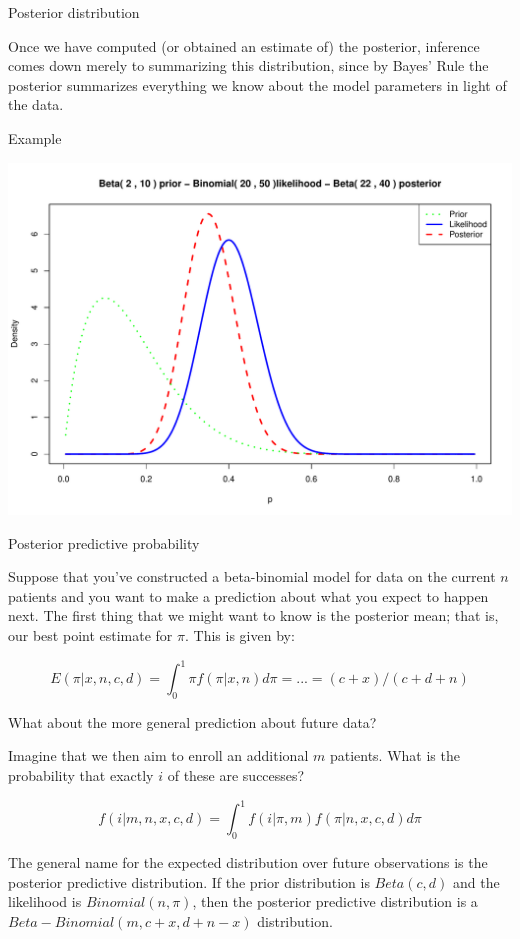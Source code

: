 \documentclass{beamer}
\begin{document}
\begin{frame}{Posterior distribution}

Once we have computed (or obtained an estimate of) the posterior,
inference comes down merely to summarizing this distribution, since by
Bayes' Rule the posterior summarizes everything we know about the model
parameters in light of the data.

\end{frame}

\begin{frame}{Example}

\includegraphics[scale=0.4]{04BetaBinomialModel_files/figure-beamer/unnamed-chunk-1-1.pdf}

\end{frame}

\begin{frame}{Posterior predictive probability}

Suppose that you've constructed a beta-binomial model for data on the
current \(n\) patients and you want to make a prediction about what you
expect to happen next. The first thing that we might want to know is the
posterior mean; that is, our best point estimate for \(\pi\). This is
given by:

\[
E\left(\pi|x,n,c,d\right)=\int_0^1 {\pi f\left(\pi|x,n\right) d\pi}=...=\left(c+x\right)/\left(c+d+n\right)
\]

What about the more general prediction about future data?

\end{frame}

\begin{frame}

Imagine that we then aim to enroll an additional \(m\) patients. What is
the probability that exactly \(i\) of these are successes?

\[
f\left(i|m,n,x,c,d\right)=\int_0^1 {f\left(i|\pi,m\right)f\left(\pi|n,x,c,d\right) d\pi}
\]

The general name for the expected distribution over future observations
is the posterior predictive distribution. If the prior distribution is
\(Beta\left(c,d\right)\) and the likelihood is
\(Binomial\left(n,\pi\right)\), then the posterior predictive
distribution is a \(Beta-Binomial\left(m,c+x,d+n-x\right)\)
distribution.

\end{frame}
\end{document}
